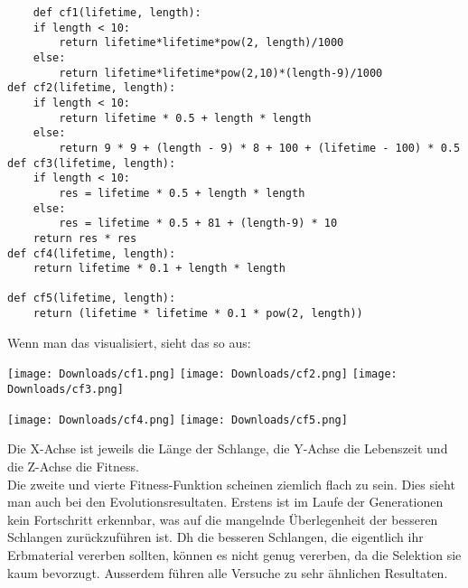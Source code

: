 \documentclass[11pt,a4paper,ngerman]{article}
\begin{document}

\begin{addmargin}[2em]{0em}
\begin{lstlisting}
    def cf1(lifetime, length):
    if length < 10:
        return lifetime*lifetime*pow(2, length)/1000
    else:
        return lifetime*lifetime*pow(2,10)*(length-9)/1000
def cf2(lifetime, length):
    if length < 10:
        return lifetime * 0.5 + length * length
    else:
        return 9 * 9 + (length - 9) * 8 + 100 + (lifetime - 100) * 0.5
def cf3(lifetime, length):
    if length < 10:
        res = lifetime * 0.5 + length * length
    else:
        res = lifetime * 0.5 + 81 + (length-9) * 10
    return res * res
def cf4(lifetime, length):
    return lifetime * 0.1 + length * length

def cf5(lifetime, length):
    return (lifetime * lifetime * 0.1 * pow(2, length))
\end{lstlisting}
\end{addmargin}

Wenn man das visualisiert, sieht das so aus:

\begin{center}
    \texttt{[image: Downloads/cf1.png]}
    \texttt{[image: Downloads/cf2.png]}
    \texttt{[image: Downloads/cf3.png]}
\end{center}


\begin{center}
    \texttt{[image: Downloads/cf4.png]}
    \texttt{[image: Downloads/cf5.png]}
\end{center}

Die X-Achse ist jeweils die Länge der Schlange, die Y-Achse die Lebenszeit und die Z-Achse die Fitness.\\

Die zweite und vierte Fitness-Funktion scheinen ziemlich flach zu sein. Dies sieht man auch bei den Evolutionsresultaten. Erstens ist im Laufe der Generationen kein Fortschritt erkennbar, was auf die mangelnde Überlegenheit der besseren Schlangen zurückzuführen ist. Dh die besseren Schlangen, die eigentlich ihr Erbmaterial vererben sollten, können es nicht genug vererben, da die Selektion sie kaum bevorzugt. Ausserdem führen alle Versuche zu sehr ähnlichen Resultaten.\\
\end{document}
